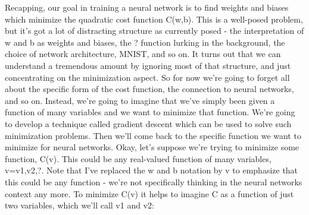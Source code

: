 Recapping, our goal in training a neural network is to find weights and biases which minimize the quadratic cost function C(w,b). This is a well-posed problem, but it's got a lot of distracting structure as currently posed - the interpretation of w and b as weights and biases, the ? function lurking in the background, the choice of network architecture, MNIST, and so on. It turns out that we can understand a tremendous amount by ignoring most of that structure, and just concentrating on the minimization aspect. So for now we're going to forget all about the specific form of the cost function, the connection to neural networks, and so on. Instead, we're going to imagine that we've simply been given a function of many variables and we want to minimize that function. We're going to develop a technique called gradient descent which can be used to solve such minimization problems. Then we'll come back to the specific function we want to minimize for neural networks.
Okay, let's suppose we're trying to minimize some function, C(v). This could be any real-valued function of many variables, v=v1,v2,?. Note that I've replaced the w and b notation by v to emphasize that this could be any function - we're not specifically thinking in the neural networks context any more. To minimize C(v) it helps to imagine C as a function of just two variables, which we'll call v1 and v2:

